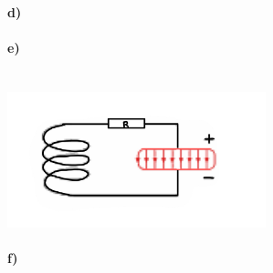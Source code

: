 \documentclass[12pt,a4paper]{report}
\begin{document}
	\paragraph{d)}
	\paragraph{e)} \mbox{} \\
	\includegraphics[width=7.5cm]{JPEG-Bild-4D19-A018-AA-0.jpeg}
	\paragraph{f)}
\end{document}

